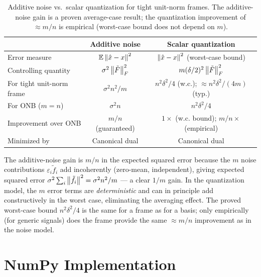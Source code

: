 \begin{table}[h]
\centering
\begin{tabular}{lcc}
\toprule
 & \textbf{Additive noise} & \textbf{Scalar quantization} \\
\midrule
Error measure & $\mathbb{E}\left\| \hat x-x \right\|^2$ & $\left\| \hat x-x \right\|^2$ (worst-case bound) \\
Controlling quantity & $\sigma^2\left\| \tilde F \right\|_F^2$ & $m(\delta/2)^2\left\| \tilde F \right\|_F^2$ \\
For tight unit-norm frame & $\sigma^2 n^2/m$ & $n^2\delta^2/4$ (w.c.); $\approx n^2\delta^2/(4m)$ (typ.) \\
For ONB ($m=n$) & $\sigma^2 n$ & $n^2\delta^2/4$ \\
Improvement over ONB & $m/n$ (guaranteed) & $1\times$ (w.c. bound); $m/n\times$ (empirical) \\
Minimized by & Canonical dual & Canonical dual \\
\bottomrule
\end{tabular}
\caption{Additive noise vs.\ scalar quantization for tight unit-norm frames.
The additive-noise gain is a proven average-case result; the quantization
improvement of $\approx m/n$ is empirical (worst-case bound does not depend on $m$).}
\label{tab:comparison}
\end{table}

\begin{remark*}
The additive-noise gain is $m/n$ in the expected squared error because
the $m$ noise contributions $\varepsilon_i\tilde f_i$ add incoherently
(zero-mean, independent), giving expected squared error
$\sigma^2\sum_i\left\| \tilde f_i \right\|^2=\sigma^2 n^2/m$ --- a clear $1/m$
gain. In the quantization model, the $m$ error terms are
\emph{deterministic} and can in principle add constructively in the
worst case, eliminating the averaging effect. The proved worst-case
bound $n^2\delta^2/4$ is the same for a frame as for a basis; only
empirically (for generic signals) does the frame provide the same
$\approx m/n$ improvement as in the noise model.
\end{remark*}

\section{NumPy Implementation}
\label{sec:numpy-ch11}

